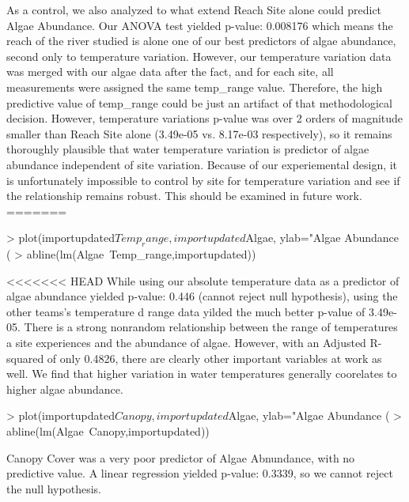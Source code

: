\documentclass{article}
\begin{document}
As a control, we also analyzed to what extend Reach Site alone could predict Algae Abundance. Our ANOVA test yielded p-value: 0.008176 which means the reach of the river studied is alone one of our best predictors of algae abundance, second only to temperature variation. However, our temperature variation data was merged with our algae data after the fact, and for each site, all measurements were assigned the same temp_range value. Therefore, the high predictive value of temp_range could be just an artifact of that methodological decision. However, temperature variations p-value was over 2 orders of magnitude smaller than Reach Site alone (3.49e-05 vs. 8.17e-03 respectively), so it remains thoroughly plausible that water temperature variation is predictor of algae abundance independent of site variation. Because of our experiemental design, it is unfortunately impossible to control by site for temperature variation and see if the relationship remains robust. This should be examined in future work. 
=======
\begin{Schunk}
\begin{Sinput}
> plot(importupdated$Temp_range,importupdated$Algae, ylab="Algae Abundance (%
> abline(lm(Algae~Temp_range,importupdated))
\end{Sinput}
\end{Schunk}
<<<<<<< HEAD
While using our absolute temperature data as a predictor of algae abundance yielded p-value: 0.446 (cannot reject null hypothesis), using the other teams's temperature d range data yilded the much better p-value of 3.49e-05. There is a strong nonrandom relationship between the range of temperatures a site experiences and the abundance of algae. However, with an Adjusted R-squared of only 0.4826, there are clearly other important variables at work as well. We find that higher variation in water temperatures generally coorelates to higher algae abundance. 
\begin{Schunk}
\begin{Sinput}
> plot(importupdated$Canopy,importupdated$Algae, ylab="Algae Abundance (%
> abline(lm(Algae~Canopy,importupdated))
\end{Sinput}
\end{Schunk}
Canopy Cover was a very poor predictor of Algae Abnundance, with no predictive value. A linear regression yielded p-value: 0.3339, so we cannot reject the null hypothesis.
\end{document}
